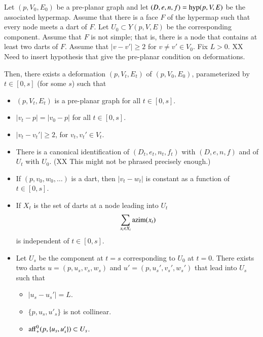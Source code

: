 \begin{lemma}\label{lemma:simple-polygon} 
Let $(p,V_0,E_0)$ be a pre-planar graph and
let $(D,e,n,f)={\operatorname{hyp}}(p,V,E)$ be the associated hypermap.
Assume that there is a face $F$ of the hypermap such that every
node meets a dart of $F$.  Let $U_0\subset Y(p,V,E)$ be the corresponding
component. 
Assume that $F$ is not simple; that is, there is a node 
that contains at least two darts of $F$.
Assume that $|v-v'|\ge2$ for $v\ne v'\in V_0$.
Fix $L>0$.
XX Need to insert hypothesis that give the pre-planar condition
on deformations.

Then, there exists a deformation
$(p,V_t,E_t)$ of $(p,V_0,E_0)$, parameterized by $t\in[0,s]$ (for some $s$) 
such
that
\begin{itemize}
\item $(p,V_t,E_t)$ is a pre-planar graph for all $t\in[0,s]$.
\item $|v_t-p| = |v_0-p|$ for all $t\in[0,s]$.
\item $|v_t-v_t'|\ge 2$, for $v_t,v_t'\in V_t$.
\item There is a canonical identification of $(D_t,e_t,n_t,f_t)$
with $(D,e,n,f)$ and of $U_t$ with $U_0$.  (XX This might not be
phrased precisely enough.)
\item If $(p,v_0,w_0,\ldots)$ is a dart, then
   $|v_t-w_t|$ is constant as a function of $t\in[0,s]$.
\item If $X_t$ is the set of darts at a node leading into $U_t$
   $$
   \sum_{x_t\in X_t} {\operatorname{azim}}(x_t)
   $$
is independent of $t\in[0,s]$.
\item 
Let $U_s$ be the component at $t=s$ corresponding to $U_0$ at $t=0$.
There exists two darts $u=(p,u_s,v_s,w_s)$ and
$u'=(p,u_s',v_s',w_s')$ that lead into $U_s$ such that
  \begin{itemize} %
  \item $|u_s-u_s'| = L$.
  \item $\{p,u_s,u'_s\}$ is not collinear.
  \item ${\operatorname{aff}}_+^0(p,\{u_s,u_s'\}) \subset U_s$.
  \end{itemize} %
\end{itemize}
\end{lemma}





